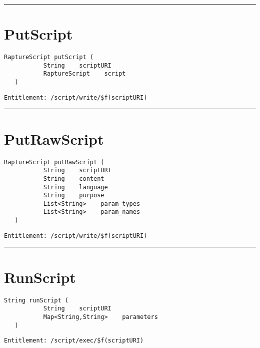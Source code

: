 \rule{12cm}{2pt}
\section{PutScript}
\label{Api:PutScript}
\begin{lstlisting}[style=nonumbers]
   RaptureScript putScript (
           String    scriptURI
           RaptureScript    script
   )
\end{lstlisting}
\begin{Verbatim}[formatcom=\color{Maroon}]
  Entitlement: /script/write/$f(scriptURI)
\end{Verbatim}



\rule{12cm}{2pt}
\section{PutRawScript}
\label{Api:PutRawScript}
\begin{lstlisting}[style=nonumbers]
   RaptureScript putRawScript (
           String    scriptURI
           String    content
           String    language
           String    purpose
           List<String>    param_types
           List<String>    param_names
   )
\end{lstlisting}
\begin{Verbatim}[formatcom=\color{Maroon}]
  Entitlement: /script/write/$f(scriptURI)
\end{Verbatim}



\rule{12cm}{2pt}
\section{RunScript}
\label{Api:RunScript}
\begin{lstlisting}[style=nonumbers]
   String runScript (
           String    scriptURI
           Map<String,String>    parameters
   )
\end{lstlisting}
\begin{Verbatim}[formatcom=\color{Maroon}]
  Entitlement: /script/exec/$f(scriptURI)
\end{Verbatim}



